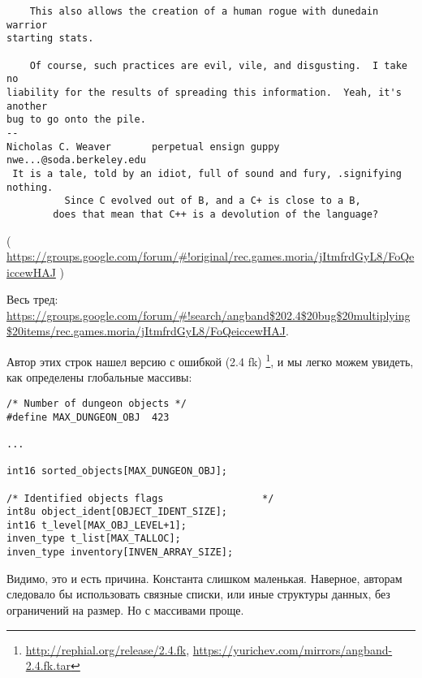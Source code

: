 \begin{lstlisting}
	This also allows the creation of a human rogue with dunedain warrior
starting stats.

	Of course, such practices are evil, vile, and disgusting.  I take no
liability for the results of spreading this information.  Yeah, it's another
bug to go onto the pile.
-- 
Nicholas C. Weaver       perpetual ensign guppy      nwe...@soda.berkeley.edu
 It is a tale, told by an idiot, full of sound and fury, .signifying nothing.
          Since C evolved out of B, and a C+ is close to a B,
        does that mean that C++ is a devolution of the language?
\end{lstlisting}
( \url{https://groups.google.com/forum/#!original/rec.games.moria/jItmfrdGyL8/FoQeiccewHAJ} )

Весь тред: \url{https://groups.google.com/forum/#!search/angband$202.4$20bug$20multiplying$20items/rec.games.moria/jItmfrdGyL8/FoQeiccewHAJ}.

Автор этих строк нашел версию с ошибкой (2.4 fk)
\footnote{\url{http://rephial.org/release/2.4.fk}, \url{https://yurichev.com/mirrors/angband-2.4.fk.tar}},
и мы легко можем увидеть, как определены глобальные массивы:

\begin{lstlisting}[style=customc]
/* Number of dungeon objects */
#define MAX_DUNGEON_OBJ  423

...

int16 sorted_objects[MAX_DUNGEON_OBJ];

/* Identified objects flags					*/
int8u object_ident[OBJECT_IDENT_SIZE];
int16 t_level[MAX_OBJ_LEVEL+1];
inven_type t_list[MAX_TALLOC];
inven_type inventory[INVEN_ARRAY_SIZE];
\end{lstlisting}

Видимо, это и есть причина. Константа  слишком маленькая.
Наверное, авторам следовало бы использовать связные списки, или иные структуры данных, без ограничений на размер.
Но с массивами проще.


